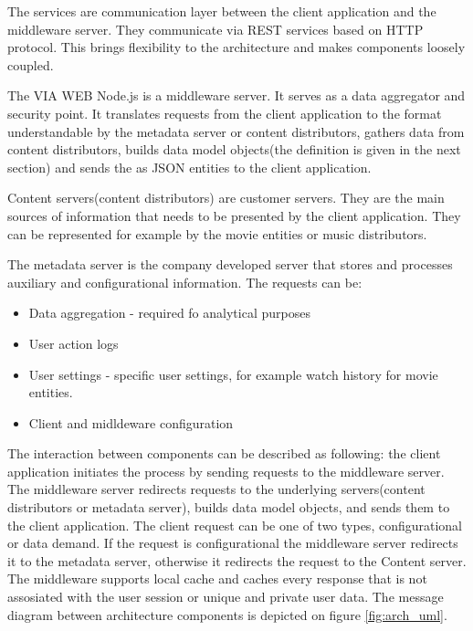 The services are communication layer between the client application and the middleware server. They communicate via REST services based on HTTP protocol. This brings flexibility to the architecture and makes components loosely coupled.

The VIA WEB Node.js is a middleware server. It serves as a data aggregator and security point. It translates requests from the client application to the format understandable by the metadata server or content distributors, gathers data from content distributors, builds data model objects(the definition is given in the next section) and sends the as JSON entities to the client application.

Content servers(content distributors) are customer servers. They are the main sources of information that needs to be presented by the client application. They can be represented for example by the movie entities or music distributors.

The metadata server is the company developed server that stores and processes auxiliary and configurational information. The requests can be: 

\begin{itemize}
	\item Data aggregation - required fo analytical purposes
	\item User action logs 
	\item User settings - specific user settings, for example watch history for movie entities.
	\item Client and midldeware configuration
\end{itemize} 

The interaction between components can be described as following: the client application initiates the process by  sending requests to the middleware server. The middleware server redirects requests to the underlying servers(content distributors or metadata server), builds data model objects, and sends them to the client application. The client request can be one of two types, configurational or data demand. If the request is configurational the middleware server redirects it to the metadata server, otherwise it redirects the request to the Content server. The middleware supports local cache and caches every response that is not assosiated with the user session or unique and private user data. The message diagram between architecture components is depicted on figure \ref{fig:arch_uml}.


